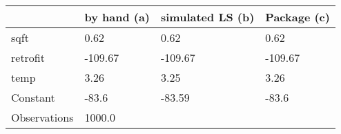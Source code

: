 \begin{tabular}{llll}
\toprule
{} & by hand (a) & simulated LS (b) & Package (c) \\
\midrule
sqft         &        0.62 &             0.62 &        0.62 \\
retrofit     &     -109.67 &          -109.67 &     -109.67 \\
temp         &        3.26 &             3.25 &        3.26 \\
Constant     &       -83.6 &           -83.59 &       -83.6 \\
Observations &      1000.0 &                  &             \\
\bottomrule
\end{tabular}
